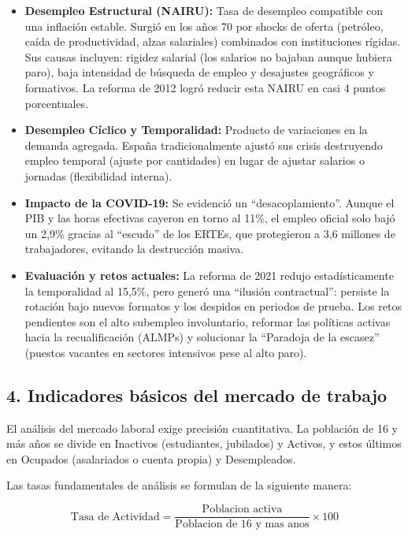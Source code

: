 \begin{itemize}
  \item \textbf{Desempleo Estructural (NAIRU):} Tasa de desempleo compatible con una inflación estable. Surgió en los años 70 por shocks de oferta (petróleo, caída de productividad, alzas salariales) combinados con instituciones rígidas. Sus causas incluyen: rigidez salarial (los salarios no bajaban aunque hubiera paro), baja intensidad de búsqueda de empleo y desajustes geográficos y formativos. La reforma de 2012 logró reducir esta NAIRU en casi 4 puntos porcentuales.

  \item \textbf{Desempleo Cíclico y Temporalidad:} Producto de variaciones en la demanda agregada. España tradicionalmente ajustó sus crisis destruyendo empleo temporal (ajuste por cantidades) en lugar de ajustar salarios o jornadas (flexibilidad interna).

  \item \textbf{Impacto de la COVID-19:} Se evidenció un ``desacoplamiento''. Aunque el PIB y las horas efectivas cayeron en torno al 11\%, el empleo oficial solo bajó un 2,9\% gracias al ``escudo'' de los ERTEs, que protegieron a 3,6 millones de trabajadores, evitando la destrucción masiva.

  \item \textbf{Evaluación y retos actuales:} La reforma de 2021 redujo estadísticamente la temporalidad al 15,5\%, pero generó una ``ilusión contractual'': persiste la rotación bajo nuevos formatos y los despidos en periodos de prueba. Los retos pendientes son el alto subempleo involuntario, reformar las políticas activas hacia la recualificación (ALMPs) y solucionar la ``Paradoja de la escasez'' (puestos vacantes en sectores intensivos pese al alto paro).
\end{itemize}

\subsection*{4. Indicadores básicos del mercado de trabajo}

El análisis del mercado laboral exige precisión cuantitativa. La población de 16 y más años se divide en Inactivos (estudiantes, jubilados) y Activos, y estos últimos en Ocupados (asalariados o cuenta propia) y Desempleados.

Las tasas fundamentales de análisis se formulan de la siguiente manera:

\[
\text{Tasa de Actividad} = \frac{\text{Poblacion activa}}{\text{Poblacion de 16 y mas anos}} \times 100
\]

